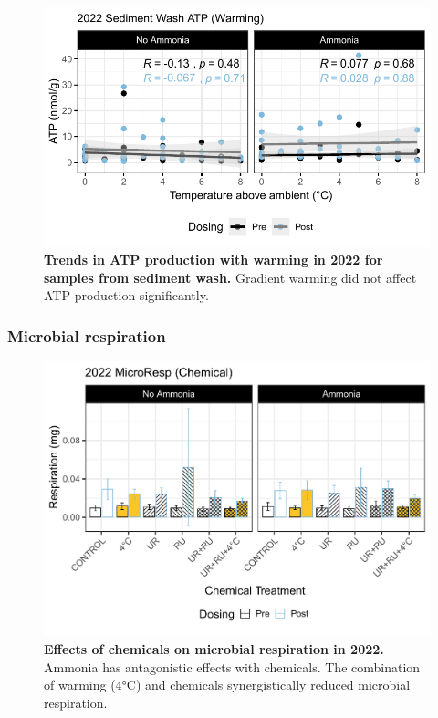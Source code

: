 \documentclass[11pt, a4paper]{article}
\begin{document}
\begin{spacing}{1.5}
\begin{figure}[H]
    \centering
    \includegraphics[scale=1]{./Figures/Regression_ATPSW}
    \caption{\textbf{Trends in ATP production with warming in 2022 for samples from sediment wash.} Gradient warming did not affect ATP production significantly.}
    \label{fig:ATPSW2022Regression}
\end{figure}

\subsubsection{Microbial respiration}

\begin{figure}[H]
    \centering
    \includegraphics[scale=0.55]{./Figures/MicroResp2022_bar_chem}
    \caption{\textbf{Effects of chemicals on microbial respiration in 2022.} Ammonia has antagonistic effects with chemicals. The combination of warming (4°C) and chemicals synergistically reduced microbial respiration.}
    \label{fig:MicroResp2022cp}
\end{figure}


\end{spacing}
\end{document}
